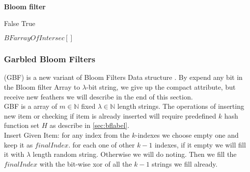 \begin{algorithm}[H]
\textbf{Bloom filter}
\begin{algorithmic}[1]
	 
\EndFor
\EndProcedure

	 
	\State \Return False
	\EndIf
\EndFor
\State \Return True
\EndFunction

\EndFor
\State \Return $BFarrayOfIntersec[]$
\EndFunction
\end{algorithmic}
\end{algorithm}


\subsubsection{Garbled Bloom Filters}
 (GBF) is a new variant of Bloom Filters Data structure \cite{dong2013private}. By expend any bit in the Bloom filter Array to $\lambda$-bit string, we give up the compact attribute, but receive new feathers we will describe in the end of this section.\\
GBF is a array of $m\in \mathbb{N}$ fixed $\lambda\in \mathbb{N}$ length strings. The operations of inserting new item or checking if item is already inserted will require predefined $k$ hash function set $H$ as describe in \ref{sec:bflabel}.\\
Insert Given Item: for any index from the $k$-indexes we choose empty one and keep it as $finalIndex$. for each one of other $k-1$ indexes, if it empty we will fill it with $\lambda$ length random string. Otherwise we will do noting.
Then we fill the $finalIndex$ with the bit-wise xor of all the $k-1$ strings we fill already.\\

